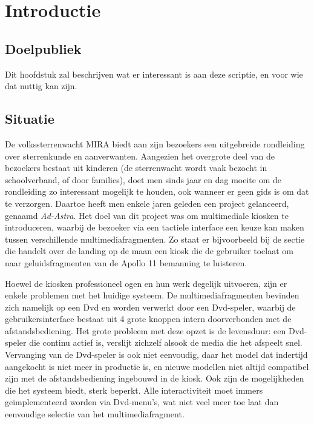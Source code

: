 \part{Introductie}
\label{introductie}


%
%

\chapter{Doelpubliek}
\label{introductie:doelpubliek}

Dit hoofdstuk zal beschrijven wat er interessant is aan deze scriptie, en voor wie dat nuttig kan zijn.


%
%

\chapter{Situatie}
\label{introductie:situatie}

De volkssterrenwacht MIRA biedt aan zijn bezoekers een uitgebreide rondleiding over sterrenkunde en aanverwanten. Aangezien het overgrote deel van de bezoekers bestaat uit kinderen (de sterrenwacht wordt vaak bezocht in schoolverband, of door families), doet men sinds jaar en dag moeite om de rondleiding zo interessant mogelijk te houden, ook wanneer er geen gids is om dat te verzorgen. Daartoe heeft men enkele jaren geleden een project gelanceerd, genaamd \emph{Ad-Astra}. Het doel van dit project was om multimediale kiosken te introduceren, waarbij de bezoeker via een tactiele interface een keuze kan maken tussen verschillende multimediafragmenten. Zo staat er bijvoorbeeld bij de sectie die handelt over de landing op de maan een kiosk die de gebruiker toelaat om naar geluidsfragmenten van de Apollo 11 bemanning te luisteren.

Hoewel de kiosken professioneel ogen en hun werk degelijk uitvoeren, zijn er enkele problemen met het huidige systeem. De multimediafragmenten bevinden zich namelijk op een Dvd en worden verwerkt door een Dvd-speler, waarbij de gebruikersinterface bestaat uit 4 grote knoppen intern doorverbonden met de afstandsbediening.
Het grote probleem met deze opzet is de levensduur: een Dvd-speler die continu actief is, verslijt zichzelf alsook de media die het afspeelt snel. Vervanging van de Dvd-speler is ook niet eenvoudig, daar het model dat indertijd aangekocht is niet meer in productie is, en nieuwe modellen niet altijd compatibel zijn met de afstandsbediening ingebouwd in de kiosk.
Ook zijn de mogelijkheden die het systeem biedt, sterk beperkt. Alle interactiviteit moet immers geïmplementeerd worden via Dvd-menu's, wat niet veel meer toe laat dan eenvoudige selectie van het multimediafragment.

